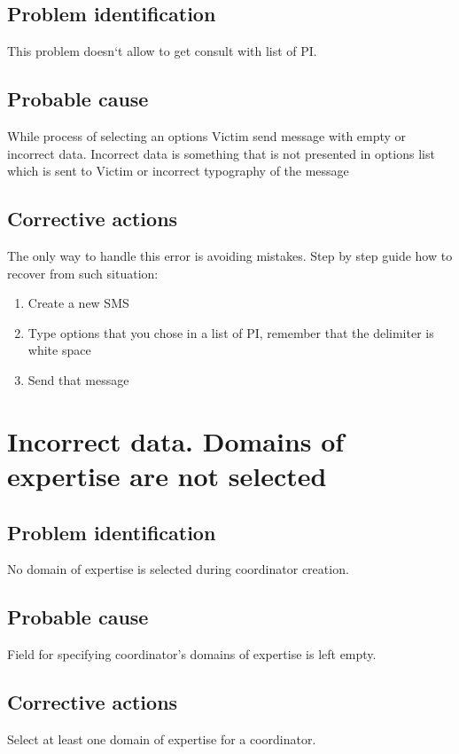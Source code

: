 \subsection{Problem identification}
This problem doesn`t allow to get consult with list of PI. 

\subsection{Probable cause}
While process of selecting an options Victim send message with empty or incorrect data. Incorrect data is something that is not presented in options list which is sent to Victim or incorrect typography of the message

\subsection{Corrective actions}
The only way to handle this error is avoiding mistakes. Step by step guide how to recover from such situation:
\begin{enumerate}
  \item Create a new SMS
  \item Type options that you chose in a list of PI, remember that the delimiter
  is white space
  \item Send that message
\end{enumerate}

\section{Incorrect data. Domains of expertise are not selected}

\subsection{Problem identification}
No domain of expertise is selected during coordinator creation. 

\subsection{Probable cause}
Field for specifying coordinator’s domains of expertise is left empty.

\subsection{Corrective actions}
Select at least one domain of expertise for a coordinator.

